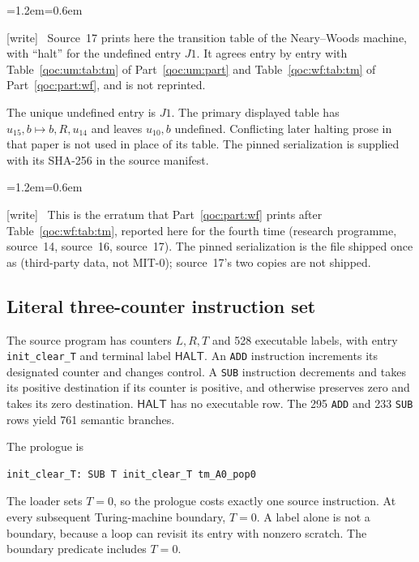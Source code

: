 \documentclass[11pt,letterpaper]{article}
\theoremstyle{definition}
\theoremstyle{remark}
\newcommand{\HALT}{\mathsf{HALT}}
\newcommand{\rncode}[1]{\texttt{#1}}
\newcommand{\wtag}{\textup{[write]}}
\newenvironment{writenote}{\par\smallskip\begin{list}{}{\leftmargin=1.2em\rightmargin=0.6em}\item[]\small\wtag\ }{\end{list}\smallskip}
\begin{document}
\begin{writenote}
Source~17 prints here the transition table of the Neary--Woods machine, with ``halt'' for the undefined entry $J1$. It agrees entry by entry with Table~\ref{qoc:um:tab:tm} of Part~\ref{qoc:um:part} and Table~\ref{qoc:wf:tab:tm} of Part~\ref{qoc:part:wf}, and is not reprinted.
\end{writenote}

The unique undefined entry is $J1$. The primary displayed table has $u_{15},b\mapsto b,R,u_{14}$ and leaves $u_{10},b$ undefined. Conflicting later halting prose in that paper is not used in place of its table. The pinned serialization \cite{rn:iijil} is supplied with its SHA-256 in the source manifest.

\begin{writenote}
This is the erratum that Part~\ref{qoc:part:wf} prints after Table~\ref{qoc:wf:tab:tm}, reported here for the fourth time (research programme, source~14, source~16, source~17). The pinned serialization is the file shipped once as  (third-party data, not MIT-0); source~17's two copies are not shipped.
\end{writenote}


\subsection{Literal three-counter instruction set}
The source program has counters $L,R,T$ and 528 executable labels, with entry \rncode{init\_clear\_T} and terminal label $\HALT$. An \rncode{ADD} instruction increments its designated counter and changes control. A \rncode{SUB} instruction decrements and takes its positive destination if its counter is positive, and otherwise preserves zero and takes its zero destination. $\HALT$ has no executable row. The 295 \rncode{ADD} and 233 \rncode{SUB} rows yield 761 semantic branches.

The prologue is
\begin{lstlisting}
init_clear_T: SUB T init_clear_T tm_A0_pop0
\end{lstlisting}
The loader sets $T=0$, so the prologue costs exactly one source instruction. At every subsequent Turing-machine boundary, $T=0$. A label alone is not a boundary, because a loop can revisit its entry with nonzero scratch. The boundary predicate includes $T=0$.
\end{document}
